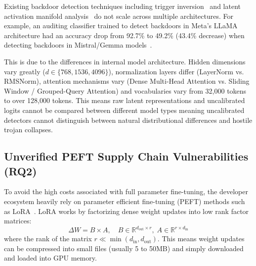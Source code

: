\documentclass[conference]{IEEEtran}
\begin{document}
Existing backdoor detection techniques including trigger inversion~\cite{wang2019neural} and latent activation manifold analysis~\cite{cohen2026backdoorid} do not scale across multiple architectures. For example, an auditing classifier trained to detect backdoors in Meta's LLaMA architecture had an accuracy drop from 92.7\% to 49.2\% (43.4\% decrease) when detecting backdoors in Mistral/Gemma models~\cite{sanna2025cross}.

This is due to the differences in internal model architecture. Hidden dimensions vary greatly ($d \in \{768, 1536, 4096\}$), normalization layers differ (LayerNorm vs. RMSNorm), attention mechanisms vary (Dense Multi-Head Attention vs. Sliding Window / Grouped-Query Attention) and vocabularies vary from 32,000 tokens to over 128,000 tokens. This means raw latent representations and uncalibrated logits cannot be compared between different model types meaning uncalibrated detectors cannot distinguish between natural distributional differences and hostile trojan collapses.

\subsection{Unverified PEFT Supply Chain Vulnerabilities (RQ2)}
To avoid the high costs associated with full parameter fine-tuning, the developer ecosystem heavily rely on parameter efficient fine-tuning (PEFT) methods such as LoRA~\cite{hu2022lora}. LoRA works by factorizing dense weight updates into low rank factor matrices:
\begin{equation}
\Delta W = B \times A, \quad B \in \mathbb{R}^{d_{\text{out}} \times r}, \; A \in \mathbb{R}^{r \times d_{\text{in}}}
\end{equation}
where the rank of the matrix $r \ll \min(d_{\text{in}}, d_{\text{out}})$. This means weight updates can be compressed into small files (usually 5 to 50MB) and simply downloaded and loaded into GPU memory.
\end{document}
